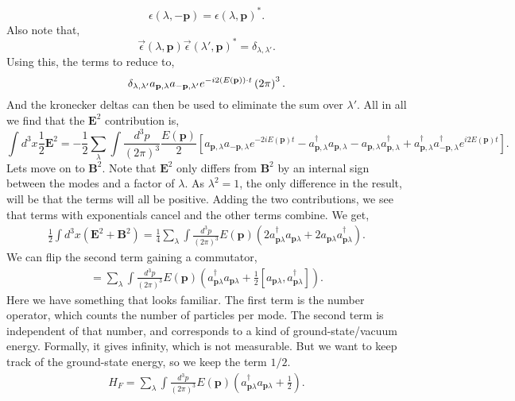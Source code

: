 \documentclass[working, oneside]{../../../Preambles/tuftebook}
\begin{document}
\begin{solution}
 \[
 \epsilon\left( \lambda, -\mathbf{p} \right) = \epsilon\left( \lambda, \mathbf{p} \right) ^{*}
 .\] 
 Also note that,
 \[
 \vec{\epsilon}\left( \lambda, \mathbf{p} \right) \vec{\epsilon}\left( \lambda', \mathbf{p} \right) ^{*} = \delta_{\lambda,\lambda'}
 .\] 
 Using this, the terms to reduce to,
 \[
 \delta_{\lambda, \lambda'}   a_{\mathbf{p}, \lambda} a_{\mathbf{-p}, \lambda'}e^{-i 2\left( E\left( \mathbf{p} \right)\right) \cdot t} \left( 2\pi \right) ^3  \\
 .\] 
 And the kronecker deltas can then be used to eliminate the sum over $\lambda'$. All in all we find that the $\mathbf{E}^2 $ contribution is,
 \[
 \int d^{3}x \frac{1}{2}\mathbf{E}^2 = -\frac{1 }{2}\sum_{\lambda}\int \frac{d^3p}{\left( 2\pi \right) ^3}\frac{E\left( \mathbf{p} \right)}{2}\left[ a_{\mathbf{p},\lambda}a_{-\mathbf{p},\lambda}e^{-2iE\left( \mathbf{p} \right) t} - a_{\mathbf{p},\lambda}^{\dagger}a_{\mathbf{p},\lambda} - a_{\mathbf{p},\lambda}a_{\mathbf{p},\lambda}^{\dagger}+ a_{\mathbf{p},\lambda}^{\dagger}a_{-\mathbf{p},\lambda}^{\dagger}e^{i 2E\left( \mathbf{p} \right) t}\right] 
 .\] 
Lets move on to $\mathbf{B}^2$. Note that $\mathbf{E}^2$ only differs from $\mathbf{B}^2$ by an internal sign between the modes and a factor of $\lambda$. As $\lambda^2 = 1$, the only difference in the result, will be that the terms will all be positive. Adding the two contributions, we see that terms with exponentials cancel and the other terms combine. We get,
\begin{align*}
   \frac{1}{2} \int d^{3}x\left( \mathbf{E}^2 + \mathbf{B}^2 \right)  = \frac{1}{4} \sum_\lambda \int \frac{d^{3}p}{\left( 2\pi \right) ^3}E\left( \mathbf{p} \right) \left( 2 a_{\mathbf{p}\lambda}^{\dagger}a_{\mathbf{p}\lambda} + 2a_{\mathbf{p}\lambda}a_{\mathbf{p}\lambda}^{\dagger} \right) 
.\end{align*}
We can flip the second term gaining a commutator,
\begin{align*}
   =  \sum_\lambda \int \frac{d^{3}p}{\left( 2\pi \right) ^3}E\left( \mathbf{p} \right) \left(  a_{\mathbf{p}\lambda}^{\dagger}a_{\mathbf{p}\lambda} + \frac{1}{2}\left[   a_{\mathbf{p}\lambda}, a_{\mathbf{p}\lambda}^{\dagger} \right]\right) 
.\end{align*}
Here we have something that looks familiar. The first term is the number operator, which counts the number of particles per mode. The second term is independent of that number, and corresponds to a kind of ground-state/vacuum energy. Formally, it gives infinity, which is not measurable. But we want to keep track of the ground-state energy, so we keep the term $1/2$.
\begin{align*}
   H_F =  \sum_\lambda \int \frac{d^{3}p}{\left( 2\pi \right) ^3}E\left( \mathbf{p} \right) \left(  a_{\mathbf{p}\lambda}^{\dagger}a_{\mathbf{p}\lambda} + \frac{1}{2}\right) 
.\end{align*}
\end{solution}
\end{document}

